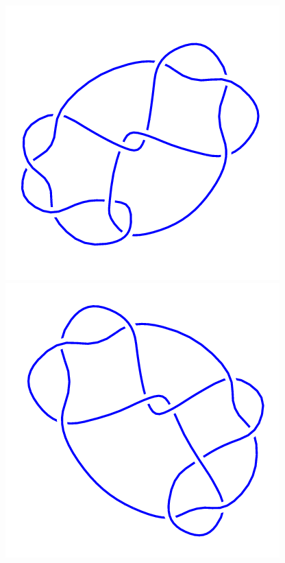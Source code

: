 \begin{figure}[H]
\begin{minipage}[b]{.18\linewidth}
    \end{minipage}
    \begin{minipage}[b]{.18\linewidth}
        \centering
        \includegraphics[width=\linewidth]{../data/10_24.png}
    \end{minipage}
    \begin{minipage}[b]{.18\linewidth}
        \centering
        \includegraphics[width=\linewidth]{../data/10_25.png}

\end{minipage}
\end{figure}
